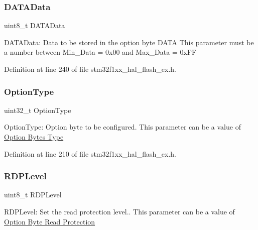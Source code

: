 \subsubsection{\texorpdfstring{D\+A\+T\+A\+Data}{DATAData}}
{\footnotesize\ttfamily uint8\+\_\+t D\+A\+T\+A\+Data}

D\+A\+T\+A\+Data\+: Data to be stored in the option byte D\+A\+TA This parameter must be a number between Min\+\_\+\+Data = 0x00 and Max\+\_\+\+Data = 0x\+FF 

Definition at line 240 of file stm32f1xx\+\_\+hal\+\_\+flash\+\_\+ex.\+h.

\mbox{\label{struct_f_l_a_s_h___o_b_program_init_type_def_ac5941efaeb6bd9e3c0852613f990ebd8}} 
\subsubsection{\texorpdfstring{Option\+Type}{OptionType}}
{\footnotesize\ttfamily uint32\+\_\+t Option\+Type}

Option\+Type\+: Option byte to be configured. This parameter can be a value of \hyperlink{group___f_l_a_s_h_ex___o_b___type}{Option Bytes Type} 

Definition at line 210 of file stm32f1xx\+\_\+hal\+\_\+flash\+\_\+ex.\+h.

\mbox{\label{struct_f_l_a_s_h___o_b_program_init_type_def_a02805f4f14c920bc29b38927556d3f45}} 
\subsubsection{\texorpdfstring{R\+D\+P\+Level}{RDPLevel}}
{\footnotesize\ttfamily uint8\+\_\+t R\+D\+P\+Level}

R\+D\+P\+Level\+: Set the read protection level.. This parameter can be a value of \hyperlink{group___f_l_a_s_h_ex___o_b___read___protection}{Option Byte Read Protection} 


